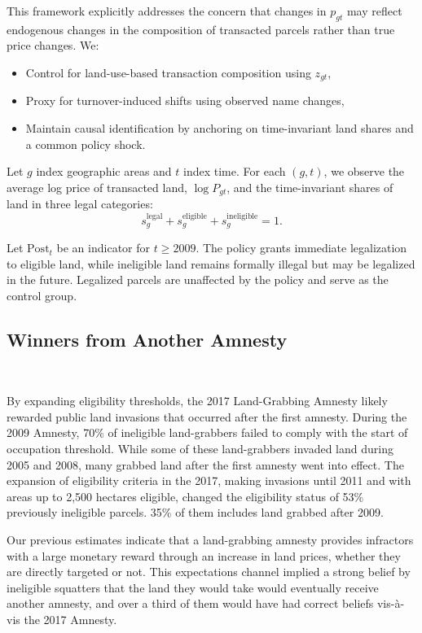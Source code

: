 \documentclass[12pt]{article}
\begin{document}
This framework explicitly addresses the concern that changes in $p_{gt}$ may reflect endogenous changes in the composition of transacted parcels rather than true price changes. We:
\begin{itemize}
    \item Control for land-use-based transaction composition using $z_{gt}$,
    \item Proxy for turnover-induced shifts using observed name changes,
    \item Maintain causal identification by anchoring on time-invariant land shares and a common policy shock.
\end{itemize}
 

Let $g$ index geographic areas and $t$ index time. For each $(g,t)$, we observe the average log price of transacted land, $\log P_{gt}$, and the time-invariant shares of land in three legal categories:
\[
s_g^{\text{legal}} + s_g^{\text{eligible}} + s_g^{\text{ineligible}} = 1.
\]

Let $\text{Post}_t$ be an indicator for $t \geq 2009$. The policy grants immediate legalization to eligible land, while ineligible land remains formally illegal but may be legalized in the future. Legalized parcels are unaffected by the policy and serve as the control group.


 \fi

\subsection{Winners from Another Amnesty}
\ 

\quad By expanding eligibility thresholds, the 2017 Land-Grabbing Amnesty likely rewarded public land invasions that occurred after the first amnesty. During the 2009 Amnesty, 70\% of ineligible land-grabbers failed to comply with the start of occupation threshold. While some of these land-grabbers invaded land during 2005 and 2008, many grabbed land after the first amnesty went into effect. The expansion of eligibility criteria in the 2017, making invasions until 2011 and with areas up to 2,500 hectares eligible, changed the eligibility status of 53\% previously ineligible parcels. 35\% of them includes land grabbed after 2009.
\ 

\quad Our previous estimates indicate that a land-grabbing amnesty provides infractors with a large monetary reward through an increase in land prices, whether they are directly targeted or not. This expectations channel implied a strong belief by ineligible squatters that the land they would take would eventually receive another amnesty, and over a third of them would have had correct beliefs vis-à-vis the 2017 Amnesty.
\ 
\end{document}
